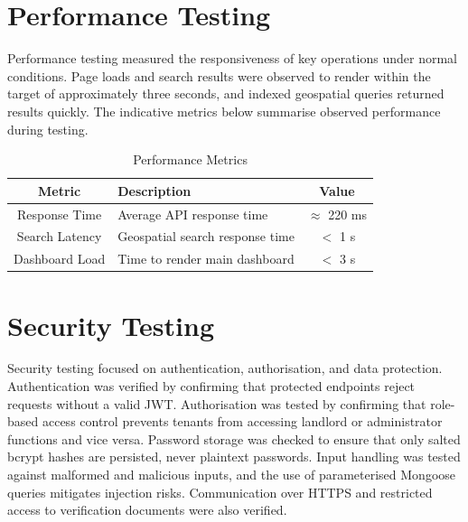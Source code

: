 
\section{Performance Testing}

Performance testing measured the responsiveness of key operations under normal conditions. Page loads and search results were observed to render within the target of approximately three seconds, and indexed geospatial queries returned results quickly. The indicative metrics below summarise observed performance during testing.

\begin{table}[h]
\centering
\caption{Performance Metrics}
\begin{tabularx}{\textwidth}{|c|X|c|}
\hline
\textbf{Metric} & \textbf{Description} & \textbf{Value} \\
\hline
Response Time & Average API response time & $\approx$ 220 ms \\
\hline
Search Latency & Geospatial search response time & $<$ 1 s \\
\hline
Dashboard Load & Time to render main dashboard & $<$ 3 s \\
\hline
\end{tabularx}
\end{table}


\section{Security Testing}

Security testing focused on authentication, authorisation, and data protection. Authentication was verified by confirming that protected endpoints reject requests without a valid JWT. Authorisation was tested by confirming that role-based access control prevents tenants from accessing landlord or administrator functions and vice versa. Password storage was checked to ensure that only salted bcrypt hashes are persisted, never plaintext passwords. Input handling was tested against malformed and malicious inputs, and the use of parameterised Mongoose queries mitigates injection risks. Communication over HTTPS and restricted access to verification documents were also verified.

